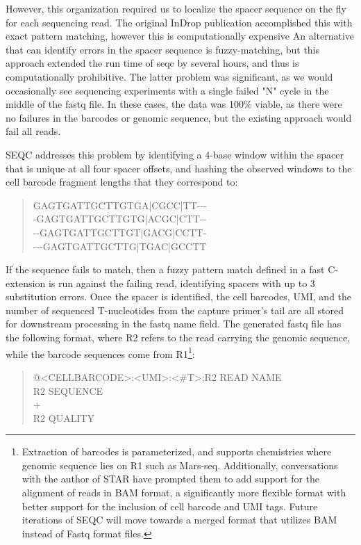 However, this organization required us to localize the spacer sequence on the fly for each sequencing read. 
The original InDrop publication accomplished this with exact pattern matching, however this is computationally expensive
An alternative that can identify errors in the spacer sequence is fuzzy-matching, but this approach extended the run time of seqc by several hours, and thus is computationally prohibitive.  
The latter problem was significant, as we would occasionally see sequencing experiments with a single failed "N" cycle in the middle of the fastq file. 
In these cases, the data was 100\% viable, as there were no failures in the barcodes or genomic sequence, but the existing approach would fail all reads. 

SEQC addresses this problem by identifying a 4-base window within the spacer that is unique at all four spacer offsets, and hashing the observed windows to the cell barcode fragment lengths that they correspond to: 
\begin{quote}
\onehalfspacing
{\mono
  GAGTGATTGCTTGTGA|CGCC|TT-{}-{}-\\ %
  -GAGTGATTGCTTGTG|ACGC|CTT-{}-\\ 
  -{}-GAGTGATTGCTTGT|GACG|CCTT-\\ 
  -{}-{}-GAGTGATTGCTTG|TGAC|GCCTT
}
\end{quote}
If the sequence fails to match, then a fuzzy pattern match defined in a fast C-extension is run against the failing read, identifying spacers with up to 3 substitution errors. 
Once the spacer is identified, the cell barcodes, UMI, and the number of sequenced T-nucleotides from the capture primer's tail are all stored for downstream processing in the fastq name field. 
The generated fastq file has the following format, where {\mono R2} refers to the read carrying the genomic sequence, while the barcode sequences come from R1\footnote{Extraction of barcodes is parameterized, and supports chemistries where genomic sequence lies on R1 such as Mars-seq. Additionally, conversations with the author of STAR have prompted them to add support for the alignment of reads in BAM format, a significantly more flexible format with better support for the inclusion of cell barcode and UMI tags. Future iterations of SEQC will move towards a merged format that utilizes BAM instead of Fastq format files.}:
\begin{quote}
\onehalfspacing
{\mono
  @<CELLBARCODE>:<UMI>:<\#T>;R2 READ NAME\\ 
  R2 SEQUENCE\\
  +\\
  R2 QUALITY
}
\end{quote}

